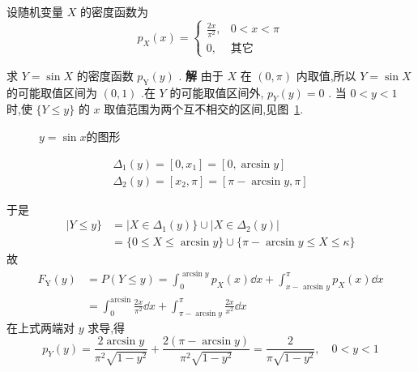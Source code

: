 \begin{example}\label{exam:2.6.4}
	设随机变量 $ X $ 的密度函数为
	\[
	p_{X}(x)=\left\{\begin{array}{ll}
	{\frac{2 x}{\pi^{2}},} & {0<x<\pi} \\ 
	{0,} & {\text{其它}}
	\end{array}\right.
	\]
	
	求 $ Y=\sin X $ 的密度函数 $ p_{\mathrm{Y}}(y) $ .
	\textbf{解} 由于 $ X $ 在 $ (0, \pi) $ 内取值,所以 $ Y=\sin X $ 的可能取值区间为 $ (0,1) $ .在 $ Y $ 的可能取值区间外, $ p_{Y}(y)=0 $ .
	当 $ 0<y<1 $ 时,使 $ \{ Y \leqslant y \} $ 的 $ x $ 取值范围为两个互不相交的区间,见图~\ref{fig:2.6.1}.
	
\begin{figure}
    \centering
    \caption{$y=\sin x$的图形}\label{fig:2.6.1}
\end{figure}
	
	\[
	\begin{array}{l}{\Delta_{1}(y)=\left[0, x_{1}\right]=[0, \arcsin y]} \\ {\Delta_{2}(y)=\left[x_{2}, \pi\right]=[\pi-\arcsin y, \pi]}\end{array}
	\]
	
	于是
	\[
	\begin{aligned} | Y \leqslant y \} &=| X \in \Delta_{1}(y) \} \cup\left|X \in \Delta_{2}(y)\right| \\ &=\{0 \leqslant X \leqslant \arcsin y\} \cup\{\pi-\arcsin y \leqslant X \leqslant \kappa\} \end{aligned}
	\]
	故
	\[
	\begin{array}{ll}
	{F_{\mathrm{Y}}(y)} & {=P(Y \leqslant y)=\int_{0}^{\arcsin y} p_{X}(x) \dd x+\int_{x-\text { arcsin } y}^{\pi} p_{X}(x) \dd x} \\ 
	{} & {=\int_{0}^{\arcsin } \frac{2 x}{\pi^{2}} \dd x+\int_{\pi-\arcsin y}^{\pi} \frac{2 x}{x^{2}} \dd x}
	\end{array}
	\]
	在上式两端对 $ y $ 求导,得
	\[
	p_{Y}(y)=\frac{2 \arcsin y}{\pi^{2} \sqrt{1-y^{2}}}+\frac{2(\pi-\arcsin y)}{\pi^{2} \sqrt{1-y^{2}}}=\frac{2}{\pi \sqrt{1-y^{2}}}, \quad 0<y<1
	\]
\end{example}

